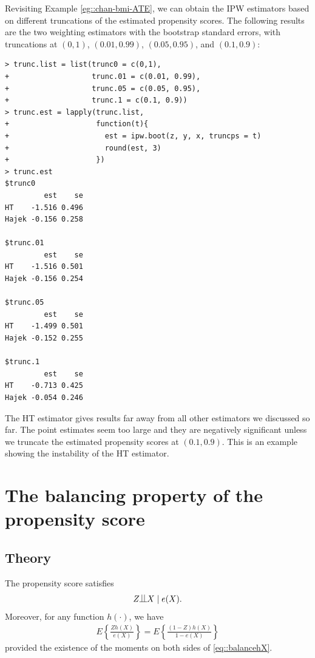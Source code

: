 Revisiting Example \ref{eg::chan-bmi-ATE}, we can obtain the IPW estimators based on different truncations of the estimated propensity scores. The following results are the two weighting estimators with the bootstrap standard errors, with truncations at $(0,1)$, $(0.01, 0.99)$, $(0.05, 0.95)$, and $(0.1, 0.9)$:
\begin{lstlisting}
> trunc.list = list(trunc0 = c(0,1), 
+                   trunc.01 = c(0.01, 0.99), 
+                   trunc.05 = c(0.05, 0.95), 
+                   trunc.1 = c(0.1, 0.9))
> trunc.est = lapply(trunc.list,
+                    function(t){
+                      est = ipw.boot(z, y, x, truncps = t)
+                      round(est, 3)
+                    })
> trunc.est
$trunc0
         est    se
HT    -1.516 0.496
Hajek -0.156 0.258

$trunc.01
         est    se
HT    -1.516 0.501
Hajek -0.156 0.254

$trunc.05
         est    se
HT    -1.499 0.501
Hajek -0.152 0.255

$trunc.1
         est    se
HT    -0.713 0.425
Hajek -0.054 0.246
\end{lstlisting}
The HT estimator gives results far away from all other estimators we discussed so far. The point estimates seem too large and they are negatively significant unless we truncate the estimated propensity scores at $(0.1, 0.9)$. This is an example showing the instability of the HT estimator. 



\section{The balancing property of the propensity score}


\subsection{Theory}



\begin{theorem}
\label{thm::pscoreASbscore}
The propensity score satisfies 
$$
Z\ind X \mid e(X) .
$$ 
Moreover, for any function $h(\cdot)$, we have 
\begin{eqnarray}
E\left\{   \frac{Zh(X)}{e(X)}   \right\} = E\left\{   \frac{(1-Z)h(X)}{1-e(X)}   \right\}
\label{eq::balancehX}
\end{eqnarray}
provided the existence of the moments on both sides of \eqref{eq::balancehX}. 
\end{theorem}


